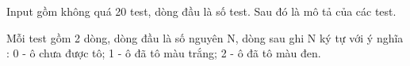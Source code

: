 Input gồm không quá 20 test, dòng đầu là số test. Sau đó là mô tả của các test.   


   Mỗi test gồm 2 dòng, dòng đầu là số nguyên N, dòng sau ghi N ký tự với ý nghĩa : 0 - ô chưa được tô; 1 - ô đã tô màu trắng; 2 - ô đã tô màu đen.